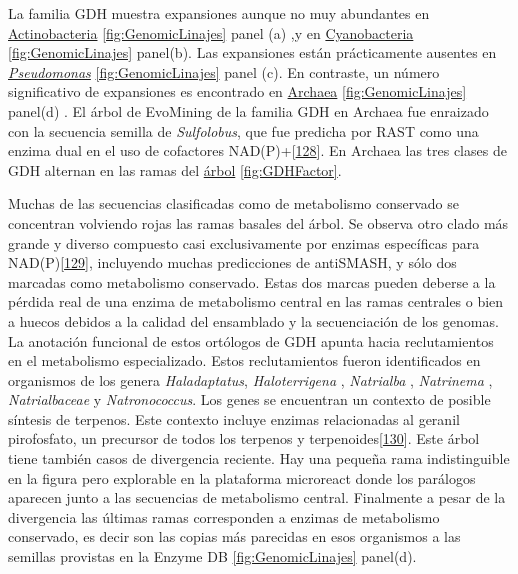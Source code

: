 \documentclass[12pt,twoside]{reedthesis}
\begin{document}
  La familia GDH muestra expansiones aunque no muy abundantes en
  \href{https://microreact.org/project/r1IhjVm6X?tt=cr}{Actinobacteria}
  \autoref{fig:GenomicLinajes} panel (a) ,y en
  \href{https://microreact.org/project/HyjYUN7pQ?tt=cr}{Cyanobacteria}
  \autoref{fig:GenomicLinajes} panel(b). Las expansiones están
  prácticamente ausentes en
  \href{https://microreact.org/project/HyjYUN7pQ?tt=cr}{\emph{Pseudomonas}}
  \autoref{fig:GenomicLinajes} panel (c). En contraste, un número
  significativo de expansiones es encontrado en
  \href{https://microreact.org/project/ByUcvNmaX?tt=cr}{Archaea}
  \autoref{fig:GenomicLinajes} panel(d) . El árbol de EvoMining de la
  familia GDH en Archaea fue enraizado con la secuencia semilla de
  \emph{Sulfolobus}, que fue predicha por RAST como una enzima dual en el
  uso de cofactores
  NAD(P)+{[}\protect\hyperlink{ref-consalvi_glutamate_1991}{128}{]}. En
  Archaea las tres clases de GDH alternan en las ramas del
  \href{https://microreact.org/project/ByUcvNmaX?tt=cr}{árbol}
  \autoref{fig:GDHFactor}.
  
  Muchas de las secuencias clasificadas como de metabolismo conservado se
  concentran volviendo rojas las ramas basales del árbol. Se observa otro
  clado más grande y diverso compuesto casi exclusivamente por enzimas
  específicas para
  NAD(P){[}\protect\hyperlink{ref-ferrer_nadp-glutamate_1996}{129}{]},
  incluyendo muchas predicciones de antiSMASH, y sólo dos marcadas como
  metabolismo conservado. Estas dos marcas pueden deberse a la pérdida
  real de una enzima de metabolismo central en las ramas centrales o bien
  a huecos debidos a la calidad del ensamblado y la secuenciación de los
  genomas. La anotación funcional de estos ortólogos de GDH apunta hacia
  reclutamientos en el metabolismo especializado. Estos reclutamientos
  fueron identificados en organismos de los genera \emph{Haladaptatus},
  \emph{Haloterrigena} , \emph{Natrialba} , \emph{Natrinema} ,
  \emph{Natrialbaceae} y \emph{Natronococcus}. Los genes se encuentran un
  contexto de posible síntesis de terpenos. Este contexto incluye enzimas
  relacionadas al geranil pirofosfato, un precursor de todos los terpenos
  y terpenoides{[}\protect\hyperlink{ref-tholl_terpene_2006}{130}{]}. Este
  árbol tiene también casos de divergencia reciente. Hay una pequeña rama
  indistinguible en la figura pero explorable en la plataforma microreact
  donde los parálogos aparecen junto a las secuencias de metabolismo
  central. Finalmente a pesar de la divergencia las últimas ramas
  corresponden a enzimas de metabolismo conservado, es decir son las
  copias más parecidas en esos organismos a las semillas provistas en la
  Enzyme DB \autoref{fig:GenomicLinajes} panel(d).
  
\end{document}
